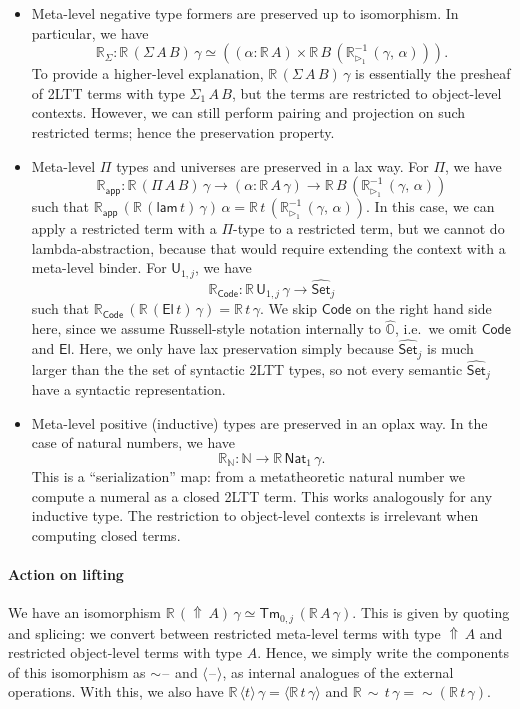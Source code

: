 \documentclass[acmsmall]{acmart}
\newcommand{\msf}[1]{\mathsf{#1}}
\newcommand{\mbb}[1]{\mathbb{#1}}
\newcommand{\wh}[1]{\widehat{#1}}
\newcommand{\ext}{\triangleright}
\newcommand{\Code}{\msf{Code}}
\newcommand{\El}{\msf{El}}
\newcommand{\lam}{\msf{lam}}
\newcommand{\app}{\msf{app}}
\newcommand{\Lift}{{\Uparrow}}
\newcommand{\spl}{{\sim}}
\newcommand{\qut}[1]{\langle #1\rangle}
\newcommand{\mbbo}{\mbb{O}}
\renewcommand{\U}{\msf{U}}
\newcommand{\Tm}{\msf{Tm}}
\newcommand{\Nat}{\msf{Nat}}
\newcommand{\Set}{\mathsf{Set}}
\newcommand{\blank}{{\mathord{\hspace{1pt}\text{--}\hspace{1pt}}}}
\newcommand{\hato}{\bm\hat{\mbbo}}
\newcommand{\re}{\mbb{R}}
\theoremstyle{remark}
\newcommand{\whset}{\wh{\Set}}
\newcommand{\rexti}{\re_{\ext_1}^{-1}}
\begin{document}
\begin{itemize}
\item Meta-level negative type formers are preserved up to isomorphism. In particular, we have
  \[ \re_{\Sigma} : \re\,(\Sigma\,A\,B)\,\gamma
  \simeq ((\alpha : \re\,A) \times \re\,B\,(\rexti\,(\gamma,\,\alpha))). \]
  To provide a higher-level explanation, $\re\,(\Sigma\,A\,B)\,\gamma$ is
  essentially the presheaf of 2LTT terms with type $\Sigma_1\,A\,B$, but the
  terms are restricted to object-level contexts. However, we can still perform
  pairing and projection on such restricted terms; hence the preservation property.

\item Meta-level $\Pi$ types and universes are preserved in a lax way. For $\Pi$, we have
  \[ \re_{\app} : \re\,(\Pi\,A\,B)\,\gamma \to (\alpha : \re\,A\,\gamma) \to \re\,B\,(\rexti\,(\gamma,\,\alpha))
  \]
  such that $\re_{\app}\,(\re\,(\lam\,t)\,\gamma)\,\alpha =
  \re\,t\,(\rexti\,(\gamma,\,\alpha))$. In this case, we can apply a restricted
  term with a $\Pi$-type to a restricted term, but we cannot do
  lambda-abstraction, because that would require extending the context with a
  meta-level binder.  For $\U_{1,j}$, we have
  \[
    \re_{\Code} : \re\,\U_{1,j}\,\gamma \to \whset_j
  \]
  such that $\re_{\Code}\,(\re\,(\El\,t)\,\gamma) = \re\,t\,\gamma$. We skip
  $\Code$ on the right hand side here, since we assume Russell-style notation
  internally to $\hato$, i.e.\ we omit $\Code$ and $\El$. Here, we only
  have lax preservation simply because $\whset_j$ is much larger than
  the the set of syntactic 2LTT types, so not every semantic $\whset_j$
  have a syntactic representation.

\item Meta-level positive (inductive) types are preserved in an oplax way. In the case of
  natural numbers, we have
  \[ \re_{\mbb{N}} : \mbb{N} \to \re\,\Nat_1\,\gamma. \]
  This is a ``serialization'' map: from a metatheoretic natural number we
  compute a numeral as a closed 2LTT term. This works analogously for any
  inductive type. The restriction to object-level contexts is irrelevant when
  computing closed terms.
\end{itemize}
\paragraph{Action on lifting} We have an isomorphism $\re\,(\Lift\,A)\,\gamma \simeq
\Tm_{0,j}\,(\re\,A\,\gamma)$. This is given by quoting and splicing: we convert
between restricted meta-level terms with type $\Lift\,A$ and restricted
object-level terms with type $A$. Hence, we simply write the components of this
isomorphism as $\spl\blank$ and $\qut{\blank}$, as internal analogues of the
external operations. With this, we also have $\re\,\qut{t}\,\gamma =
\qut{\re\,t\,\gamma}$ and $\re\,\spl\,t\,\gamma = \spl(\re\,t\,\gamma)$.
\end{document}
